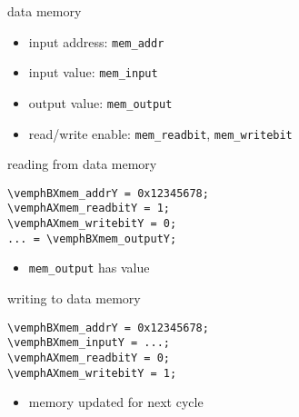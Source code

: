 
\begin{frame}{data memory}
    \begin{itemize}
    \item input address: {\tt mem\_addr}
    \item input value: {\tt mem\_input}
    \item output value: {\tt mem\_output}
    \item read/write enable: {\tt mem\_readbit}, {\tt mem\_writebit}
    \end{itemize}
\end{frame}

\begin{frame}[fragile,label=dmemRead]{reading from data memory}
\begin{Verbatim}[fontsize=\fontsize{13}{14}\selectfont,commandchars=\\XY]
\vemphBXmem_addrY = 0x12345678;
\vemphAXmem_readbitY = 1;
\vemphAXmem_writebitY = 0;
... = \vemphBXmem_outputY;
\end{Verbatim}
\begin{itemize}
\item {\tt mem\_output} has value 
\end{itemize}
\end{frame}


\begin{frame}[fragile,label=dmemWrite]{writing to data memory}
\begin{Verbatim}[fontsize=\fontsize{13}{14}\selectfont,commandchars=\\XY]
\vemphBXmem_addrY = 0x12345678;
\vemphBXmem_inputY = ...;
\vemphAXmem_readbitY = 0;
\vemphAXmem_writebitY = 1;
\end{Verbatim}
\begin{itemize}
\item memory updated for next cycle
\end{itemize}
\end{frame}

